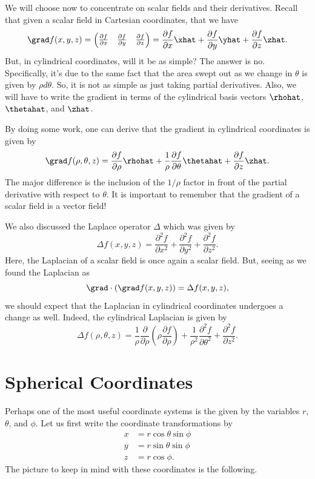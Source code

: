 We will choose now to concentrate on scalar fields and their derivatives.  Recall that given a scalar field in Cartesian coordinates, that we have
\[
\grad f(x,y,z) = \begin{pmatrix} \frac{\partial f}{\partial x} & \frac{\partial f}{\partial y} & \frac{\partial f}{\partial z} \end{pmatrix} = \frac{\partial f}{\partial x}\xhat + \frac{\partial f}{\partial y}\yhat + \frac{\partial f}{\partial z} \zhat.
\]
But, in cylindrical coordinates, will it be as simple?  The answer is no.  Specifically, it's due to the same fact that the area swept out as we change in $\theta$ is given by $\rho d\theta$. So, it is not as simple as just taking partial derivatives. Also, we will have to write the gradient in terms of the cylindrical basis vectors $\rhohat$, $\thetahat$, and $\zhat$.  

By doing some work, one can derive that the gradient in cylindrical coordinates is given by 
\[
\grad f(\rho,\theta,z) = \frac{\partial f}{\partial \rho} \rhohat + \frac{1}{\rho} \frac{\partial f}{\partial \theta} \thetahat + \frac{\partial f}{\partial z}\zhat.
\]
The major difference is the inclusion of the $1/\rho$ factor in front of the partial derivative with respect to $\theta$. It is important to remember that the gradient of a scalar field is a vector field!

We also discussed the Laplace operator $\Delta$ which was given by
\[
\Delta f(x,y,z) = \frac{\partial^2 f}{\partial x^2} + \frac{\partial^2 f}{\partial y^2} + \frac{\partial^2 f}{\partial z^2}.
\]
Here, the Laplacian of a scalar field is once again a scalar field.  But, seeing as we found the Laplacian as
\[
\grad \cdot (\grad f(x,y,z)) = \Delta f(x,y,z),
\]
we should expect that the Laplacian in cylindrical coordinates undergoes a change as well.  Indeed, the cylindrical Laplacian is given by
\[
\Delta f(\rho,\theta,z) = \frac{1}{\rho} \frac{\partial}{\partial \rho} \left(\rho \frac{\partial f}{\partial \rho}\right)+\frac{1}{\rho^2} \frac{\partial^2 f}{\partial \theta^2} + \frac{\partial^2 f}{\partial z^2}.
\]


\section{Spherical Coordinates}

Perhaps one of the most useful coordinate systems is the  given by the variables $r$, $\theta$, and $\phi$.  Let us first write the coordinate transformations by
\begin{align*}
    x &= r\cos \theta \sin \phi\\
    y &= r\sin \theta \sin \phi\\
    z &= r\cos \phi.
\end{align*}
The picture to keep in mind with these coordinates is the following.

